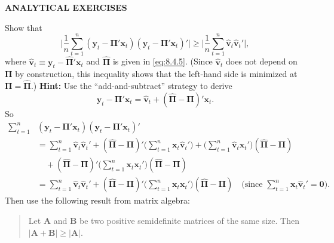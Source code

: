 
\begin{problemset}

\textbf{ANALYTICAL EXERCISES}

\exercise[1]
Show that
\begin{equation}
  \biggl|\frac{1}{n}\sum_{t=1}^{n}
    (\mathbf{y}_t - \boldsymbol{\Pi}'\mathbf{x}_t)
    (\mathbf{y}_t - \boldsymbol{\Pi}'\mathbf{x}_t)'\biggr|
  \geq \biggl|\frac{1}{n}\sum_{t=1}^{n}
    \hat{\mathbf{v}}_t \hat{\mathbf{v}}_t'\biggr|,
  \tag{1}
\end{equation}
where $\hat{\mathbf{v}}_t \equiv \mathbf{y}_t - \hat{\boldsymbol{\Pi}}'\mathbf{x}_t$ and $\hat{\boldsymbol{\Pi}}$ is given in \eqref{eq:8.4.5}. (Since $\hat{\mathbf{v}}_t$ does not depend on
$\boldsymbol{\Pi}$ by construction, this inequality shows that the left-hand side is minimized at
$\boldsymbol{\Pi} = \hat{\boldsymbol{\Pi}}$.) \textbf{Hint:} Use the ``add-and-subtract'' strategy to derive
\[
  \mathbf{y}_t - \boldsymbol{\Pi}'\mathbf{x}_t
  = \hat{\mathbf{v}}_t + (\hat{\boldsymbol{\Pi}} - \boldsymbol{\Pi})'\mathbf{x}_t.
\]
So
\begin{align*}
  \sum_{t=1}^{n}
    &(\mathbf{y}_t - \boldsymbol{\Pi}'\mathbf{x}_t)
    (\mathbf{y}_t - \boldsymbol{\Pi}'\mathbf{x}_t)' \\
  &= \sum_{t=1}^{n} \hat{\mathbf{v}}_t\hat{\mathbf{v}}_t'
    + (\hat{\boldsymbol{\Pi}} - \boldsymbol{\Pi})'
    \biggl(\sum_{t=1}^{n} \mathbf{x}_t\hat{\mathbf{v}}_t'\biggr)
    + \biggl(\sum_{t=1}^{n} \hat{\mathbf{v}}_t\mathbf{x}_t'\biggr)
    (\hat{\boldsymbol{\Pi}} - \boldsymbol{\Pi}) \\
  &\quad+ (\hat{\boldsymbol{\Pi}} - \boldsymbol{\Pi})'
    \biggl(\sum_{t=1}^{n} \mathbf{x}_t\mathbf{x}_t'\biggr)
    (\hat{\boldsymbol{\Pi}} - \boldsymbol{\Pi}) \\
  &= \sum_{t=1}^{n} \hat{\mathbf{v}}_t\hat{\mathbf{v}}_t'
    + (\hat{\boldsymbol{\Pi}} - \boldsymbol{\Pi})'
    \biggl(\sum_{t=1}^{n} \mathbf{x}_t\mathbf{x}_t'\biggr)
    (\hat{\boldsymbol{\Pi}} - \boldsymbol{\Pi})
  \quad\biggl(\text{since }
    \sum_{t=1}^{n} \mathbf{x}_t\hat{\mathbf{v}}_t' = \mathbf{0}\biggr).
\end{align*}
Then use the following result from matrix algebra:
\begin{quote}
Let $\mathbf{A}$ and $\mathbf{B}$ be two positive semidefinite matrices of the same size.
Then $|\mathbf{A} + \mathbf{B}| \geq |\mathbf{A}|$.
\end{quote}


\end{problemset}
